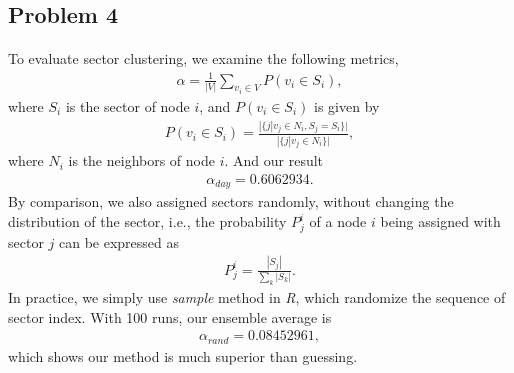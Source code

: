 \subsection*{Problem 4}
\paragraph{}
To evaluate sector clustering, we examine the following metrics,
\begin{align*}
\alpha = \frac{1}{|V|}\sum_{v_i \in V}P(v_i \in S_i),
\end{align*}
where $S_i$ is the sector of node $i$, and $P(v_i \in S_i)$ is given by
\begin{align*}
P(v_i \in S_i) = \frac{|\{j|v_j \in N_i, S_j = S_i\}|}{|\{j|v_j \in N_i\}|},
\end{align*}
where $N_i$ is the neighbors of node $i$. And our result
\begin{align*}
\alpha_{day} =  0.6062934.
\end{align*}
By comparison, we also assigned sectors randomly, without changing the distribution of the sector, i.e., the probability $P^i_j$ of a node $i$ being assigned with sector $j$ can be expressed as
\begin{align*}
P^i_j = \frac{|S_j|}{\sum_k |S_k|}.
\end{align*}
In practice, we simply use \textit{sample} method in \textit{R}, which randomize the sequence of sector index. With 100 runs, our ensemble average is
\begin{align*}
\alpha_{rand} = 0.08452961,
\end{align*}
which shows our method is much superior than guessing.